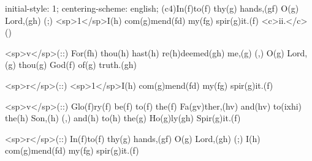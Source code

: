 initial-style: 1;
centering-scheme: english;
(c4)In(f)to(f) thy(g) hands,(gf) O(g) Lord,(gh) (;) <sp>1</sp>I(h) com(g)mend(fd) my(fg) spir(g)it.(f) <c>ii.</c>()

<sp>v</sp>(::) For(fh) thou(h) hast(h) re(h)deemed(gh) me,(g) (,) O(g) Lord,(g) thou(g) God(f) of(g) truth.(gh) 

<sp>r</sp>(::) <sp>1</sp>I(h) com(g)mend(fd) my(fg) spir(g)it.(f) 

<sp>v</sp>(::) Glo(f)ry(f) be(f) to(f) the(f) Fa(gv)ther,(hv) and(hv) to(ixhi) the(h) Son,(h) (,) and(h) to(h) the(g) Ho(g)ly(gh) Spir(g)it.(f)

<sp>r</sp>(::) In(f)to(f) thy(g) hands,(gf) O(g) Lord,(gh) (;) I(h) com(g)mend(fd) my(fg) spir(g)it.(f) 